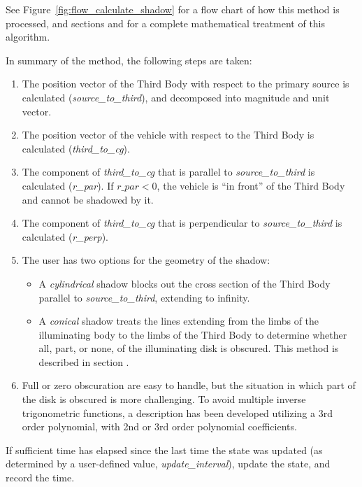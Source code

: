 {\begin{enumerate}
{\begin{enumerate}
See Figure~\ref{fig:flow_calculate_shadow} for a flow chart of how this method
is processed, and sections  and  for a complete mathematical treatment
of this algorithm.

In summary of the method, the following steps are taken:
{\begin{enumerate}
\item The position vector of the Third Body with respect to the primary source
is calculated (\textit{source\_to\_third}), and decomposed into magnitude and
unit vector.
\item The position vector of the vehicle with respect to the Third Body is
calculated (\textit{third\_to\_cg}).
\item The component of \textit{third\_to\_cg} that is parallel to
\textit{source\_to\_third} is calculated (\textit{r\_par}).  If $r\_par < 0$,
the vehicle is ``in front'' of the Third Body and cannot be shadowed by it.
\item The component of \textit{third\_to\_cg} that is perpendicular to
\textit{source\_to\_third} is calculated (\textit{r\_perp}).
\item The user has two options for the geometry of the shadow:

{\begin{itemize}
\item A \textit{cylindrical} shadow blocks out the cross section of the Third
Body parallel to \textit{source\_to\_third}, extending to infinity.
\item A \textit{conical} shadow treats the lines extending from the limbs of
the illuminating body to the limbs of the Third Body to determine whether all,
part, or none, of the illuminating disk is obscured.  This method is described
in section .
\end{itemize}}
\item Full or zero obscuration are easy to handle, but the situation in which
part of the disk is obscured is more challenging.  To avoid multiple inverse
trigonometric functions, a description has been developed utilizing a 3rd order
polynomial, with 2nd or 3rd order polynomial coefficients.
\end{enumerate}}

If sufficient time has elapsed since the last time the state was updated (as
determined by a user-defined value, \textit{update\_interval}), update the
state, and record the time.


\end{enumerate}}
\end{enumerate}}
